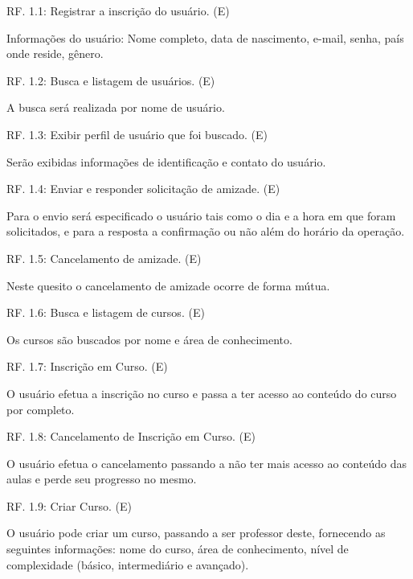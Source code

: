 \documentclass[12pt,a4paper,onecolumn,titlepage]{article}
\begin{document}
\begin{description}


\item RF. 1.1: Registrar a inscrição do usuário. (E)
\item \qquad Informações do usuário: Nome completo, data de nascimento, e-mail, senha, país onde reside, gênero.

\item RF. 1.2: Busca e listagem de usuários. (E)
\item \qquad A busca será realizada por nome de usuário.

\item RF. 1.3: Exibir perfil de usuário que foi buscado. (E)
\item \qquad Serão exibidas informações de identificação e contato do usuário.

\item RF. 1.4: Enviar e responder solicitação de amizade. (E)
\item \qquad Para o envio será especificado o usuário tais como o dia e a hora em que foram solicitados, e para a resposta a confirmação ou não além do horário da operação.

\item RF. 1.5: Cancelamento de amizade. (E)
\item \qquad Neste quesito o cancelamento de amizade ocorre de forma mútua.

\item RF. 1.6: Busca e listagem de cursos. (E)
\item \qquad Os cursos são buscados por nome e área de conhecimento.
 
\item RF. 1.7: Inscrição em Curso. (E)
\item \qquad O usuário efetua a inscrição no curso e passa a ter acesso ao conteúdo do curso por completo.

\item RF. 1.8: Cancelamento de Inscrição em Curso. (E)
\item \qquad O usuário efetua o cancelamento passando a não ter mais acesso ao conteúdo das aulas e perde seu progresso no mesmo.

\item RF. 1.9: Criar Curso. (E)
\item \qquad O usuário pode criar um curso, passando a ser professor deste, fornecendo as seguintes informações: nome do curso, área de conhecimento, nível de complexidade (básico, intermediário e avançado).


\end{description}
\end{document}
